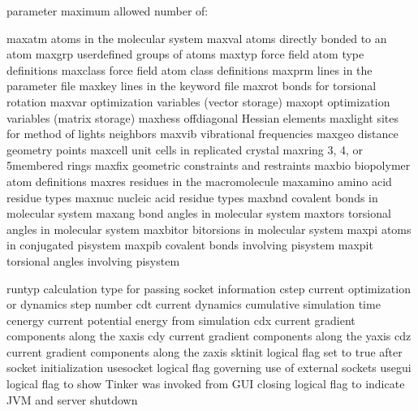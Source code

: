 \documentclass[letterpaper,11pt,english]{sphinxmanual}
\begin{document}
\begin{sphinxVerbatim}[commandchars=\\\{\}]
parameter       maximum allowed number of:

maxatm          atoms in the molecular system
maxval          atoms directly bonded to an atom
maxgrp          user\PYGZhy{}defined groups of atoms
maxtyp          force field atom type definitions
maxclass        force field atom class definitions
maxprm          lines in the parameter file
maxkey          lines in the keyword file
maxrot          bonds for torsional rotation
maxvar          optimization variables (vector storage)
maxopt          optimization variables (matrix storage)
maxhess         off\PYGZhy{}diagonal Hessian elements
maxlight        sites for method of lights neighbors
maxvib          vibrational frequencies
maxgeo          distance geometry points
maxcell         unit cells in replicated crystal
maxring         3\PYGZhy{}, 4\PYGZhy{}, or 5\PYGZhy{}membered rings
maxfix          geometric constraints and restraints
maxbio          biopolymer atom definitions
maxres          residues in the macromolecule
maxamino        amino acid residue types
maxnuc          nucleic acid residue types
maxbnd          covalent bonds in molecular system
maxang          bond angles in molecular system
maxtors         torsional angles in molecular system
maxbitor        bitorsions in molecular system
maxpi           atoms in conjugated pisystem
maxpib          covalent bonds involving pisystem
maxpit          torsional angles involving pisystem
\end{sphinxVerbatim}


\begin{sphinxVerbatim}[commandchars=\\\{\}]
runtyp          calculation type for passing socket information
cstep           current optimization or dynamics step number
cdt             current dynamics cumulative simulation time
cenergy         current potential energy from simulation
cdx             current gradient components along the x\PYGZhy{}axis
cdy             current gradient components along the y\PYGZhy{}axis
cdz             current gradient components along the z\PYGZhy{}axis
skt\PYGZus{}init        logical flag set to true after socket initialization
use\PYGZus{}socket      logical flag governing use of external sockets
use\PYGZus{}gui         logical flag to show Tinker was invoked from GUI
closing         logical flag to indicate JVM and server shutdown
\end{sphinxVerbatim}
\end{document}

